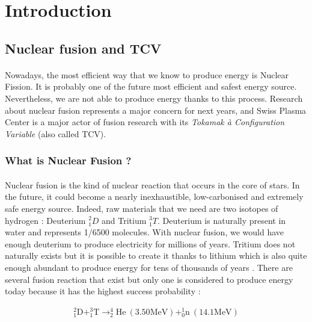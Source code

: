 \documentclass[12pt]{article}
\begin{document}
\tableofcontents
\newpage
\setcounter{page}{1}
\section{Introduction}

\subsection{Nuclear fusion and TCV}

\paragraph{}
Nowadays, the most efficient way that we know to produce energy is Nuclear Fission. It is probably one of the future most efficient and safest energy source. Nevertheless, we are not able to produce energy thanks to this process. Research about nuclear fusion represents a major concern for next years, and Swiss Plasma Center is a major actor of fusion research with its \textit{Tokamak à Configuration Variable} (also called TCV).
    
\subsubsection{What is Nuclear Fusion ?}

\paragraph{}
Nuclear fusion is the kind of nuclear reaction that occurs in the core of stars. In the future, it could become a nearly inexhaustible, low-carbonised and extremely safe energy source. Indeed, raw materials that we need are two isotopes of hydrogen : Deuterium \(_1 ^2 D\) and Tritium \(_1 ^3 T\). Deuterium is naturally present in water and represents 1/6500 molecules. With nuclear fusion, we would have enough deuterium to produce electricity for millions of years. Tritium does not naturally exists but it is possible to create it thanks to lithium which is also quite enough abundant to produce energy for tens of thousands of years \cite{yves_martin_fusion_2014}. There are several fusion reaction that exist but only one is considered to produce energy today because it has the highest success probability :

\begin{gather}\label{eq:Reaction D-T}
    _1 ^2 \textrm{D} + _1 ^3 \textrm{T} \rightarrow _2 ^4 \textrm{He} ~(3.50 \textrm{MeV}) + _0 ^1 \textrm{n}~(14.1 \textrm{MeV})
\end{gather}
\end{document}
